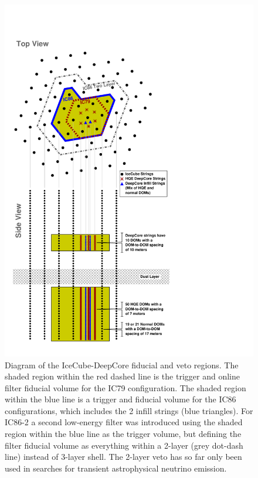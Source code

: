 \documentclass[../Main.tex]{subfiles}
\begin{document}
\begin{figure}
\centering
\includegraphics[scale=0.6]{IC86EDC_DeepCoreDiagram.pdf}
\caption{\label{fig:IC86EDCDiagram} Diagram of the IceCube-DeepCore
  fiducial and veto regions. The shaded region within the red dashed
  line is the trigger and online filter fiducial volume for the IC79
  configuration. The shaded region within the blue line is a
  trigger and fiducial volume for the IC86 configurations, which includes
  the 2 infill strings (blue triangles). For IC86-2
  a second low-energy filter was introduced using the shaded region
  within the blue line as the trigger volume, but defining the filter fiducial
  volume as everything within a 2-layer (grey dot-dash line) instead
  of 3-layer shell. The 2-layer veto has so far only been used in
  searches for transient astrophysical neutrino emission. 
}
\end{figure}
\end{document}
